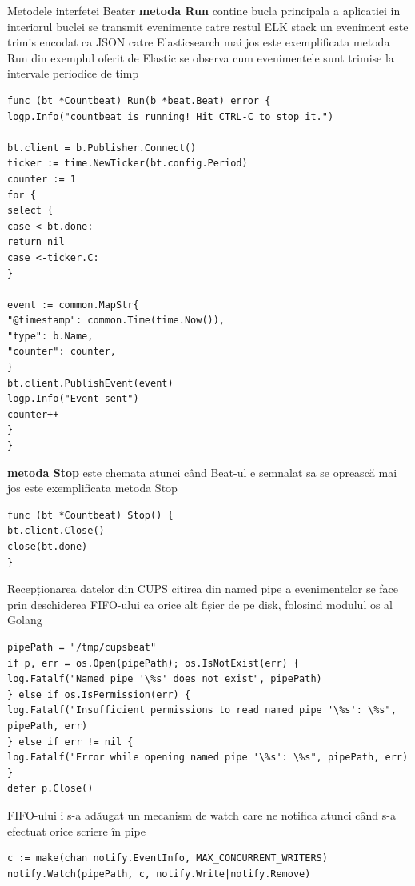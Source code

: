 \documentclass[a4paper, 12pt, twoside]{report}
\begin{document}
\begin{outline}
\1 {\large Metodele interfetei Beater}
	\2
	\textbf{metoda Run}
		\3 contine bucla principala a aplicatiei
		\3 in interiorul buclei se transmit evenimente catre restul ELK stack
		\3 un eveniment este trimis encodat ca JSON catre Elasticsearch
		\3 mai jos este exemplificata metoda Run din exemplul oferit de Elastic
		\3 se observa cum evenimentele sunt trimise la intervale periodice de timp
\begin{lstlisting}[caption={exemplu metoda Run - golang},captionpos=b]
func (bt *Countbeat) Run(b *beat.Beat) error {
logp.Info("countbeat is running! Hit CTRL-C to stop it.")

bt.client = b.Publisher.Connect()
ticker := time.NewTicker(bt.config.Period)
counter := 1
for {
select {
case <-bt.done:
return nil
case <-ticker.C:
}

event := common.MapStr{
"@timestamp": common.Time(time.Now()),
"type": b.Name,
"counter": counter,
}
bt.client.PublishEvent(event)
logp.Info("Event sent")
counter++
}
}
\end{lstlisting}

	\2
	\textbf{metoda Stop}
		\3 este chemata atunci când Beat-ul e semnalat sa se oprească
		\3 mai jos este exemplificata metoda Stop
\begin{lstlisting}[caption={exemplu metoda Stop - golang},captionpos=b]
func (bt *Countbeat) Stop() {
bt.client.Close()
close(bt.done)
}
\end{lstlisting}
\1 {\large Recepționarea datelor din CUPS}
	\2 citirea din named pipe a evenimentelor se face prin deschiderea FIFO-ului ca orice alt fișier de pe disk, folosind modulul os al Golang
\begin{lstlisting}[caption={deschidere named pipe - golang},captionpos=b]
pipePath = "/tmp/cupsbeat"
if p, err = os.Open(pipePath); os.IsNotExist(err) {
log.Fatalf("Named pipe '\%s' does not exist", pipePath)
} else if os.IsPermission(err) {
log.Fatalf("Insufficient permissions to read named pipe '\%s': \%s", pipePath, err)
} else if err != nil {
log.Fatalf("Error while opening named pipe '\%s': \%s", pipePath, err)
}
defer p.Close()
\end{lstlisting}

	\2 FIFO-ului i s-a adăugat un mecanism de watch care ne notifica atunci când s-a efectuat orice scriere în pipe
\begin{lstlisting}[caption={watch pentru named pipe - golang},captionpos=b]
c := make(chan notify.EventInfo, MAX_CONCURRENT_WRITERS)
notify.Watch(pipePath, c, notify.Write|notify.Remove)
\end{lstlisting}


\end{outline}
\end{document}
